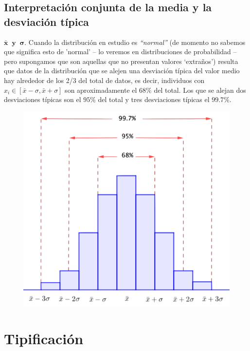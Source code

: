 \subsection{Interpretación conjunta de la media y la desviación típica}
\label{mediaydesviacion}
	
\begin{myalertblock}{$\boldsymbol{ \bar x \ \text{ y } \ \sigma. }$}
	Cuando la distribución en estudio es \emph{``normal''} (de momento no sabemos que significa esto de 'normal' -- lo veremos en distribuciones de probabilidad -- pero supongamos que son aquellas que no presentan valores `extraños') resulta que datos de la distribución que se alejen una desviación típica del valor medio hay alrededor de los 2/3 del total de datos, es decir, individuos con $x_i\in[\bar x -\sigma, \bar x+\sigma]$ son aproximadamente el $68\%$ del total. Los que se alejan dos desviaciones típicas son el $95\%$ del total y tres desviaciones típicas el $99.7\%$.
	
	\begin{figure}[H]
			\centering
			\includegraphics[width=.7\textwidth]{imagenes/imagenes01/T01IM21.png}
	\end{figure}
\end{myalertblock}

\section{Tipificación}

